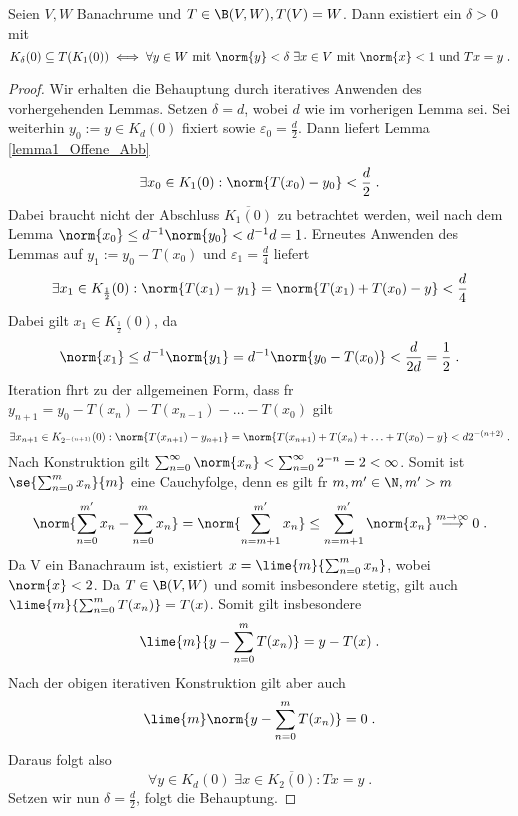 \begin{lemma}
	Seien \(V,W\) Banachr\as ume und \(T\in \B(V,W), T(V) = W\). Dann existiert ein \(\delta > 0\) mit 
	\[K_\delta(0) \subseteq T(K_1(0)) \iff \forall y\in W \text{ mit }\norm{y}<\delta \;\exists x\in V \text{ mit } \norm{x} < 1 \text{ und } Tx = y\;.\]
	\label{lemma2_Offene_Abb}
\end{lemma}
\begin{proof}
	Wir erhalten die Behauptung durch iteratives Anwenden des vorhergehenden Lemmas. Setzen \(\delta = d\), wobei $d$ wie im vorherigen Lemma sei. Sei weiterhin \(y_0:=y\in K_d(0)\) fixiert sowie \(\varepsilon_0 = \frac{d}{2}\). Dann liefert Lemma \ref{lemma1_Offene_Abb}
	\[\exists x_0 \in K_1(0): \norm{T(x_0) - y_0} < \frac{d}{2}\;.\]
	Dabei braucht nicht der Abschluss \(\overline{K_1(0)}\) zu betrachtet werden, weil nach dem Lemma \(\norm{x_0} \leq d^{-1} \norm{y_0} < d^{-1} d =1\). Erneutes Anwenden des Lemmas auf \(y_1:= y_0 -T(x_0)\) und \(\varepsilon_1 = \frac{d}{4}\) liefert
	\[\exists x_1 \in K_{\frac{1}{2}}(0): \norm{T(x_1) - y_1} = \norm{T(x_1) + T(x_0) - y} < \frac{d}{4}\]
	Dabei gilt \(x_1 \in K_{\frac{1}{2}}(0)\), da
	\[\norm{x_1} \leq d^{-1} \norm{y_1} = d^{-1} \norm{y_0 -T(x_0)} < \frac{d}{2d} = \frac{1}{2}\;.\]
	Iteration f\us hrt zu der allgemeinen Form, dass f\us r \(y_{n+1} = y_0 - T(x_n) -T(x_{n-1})- \ldots - T(x_0)\) gilt
	\[\exists x_{n+1} \in K_{2^{-(n+1)}}(0): \norm{T(x_{n+1})-y_{n+1}} =\norm{T(x_{n+1}) + T(x_n) + \ldots + T(x_0) - y} < d 2^{-(n+2)}\;.\]
	Nach Konstruktion gilt \(\sum_{n=0}^\infty \norm{x_n} < \sum_{n=0}^{\infty} 2^{-n} = 2 < \infty\). Somit ist \(\se{\sum_{n=0}^m x_n}{m}\) eine Cauchyfolge, denn es gilt f\us r \(m,m'\in \N, m' > m\)
	\[ \norm{\sum_{n=0}^{m'} x_n - \sum_{n=0}^{m} x_n} = \norm{\sum_{n=m+1}^{m'} x_n} \leq \sum_{n=m+1}^{m'} \norm{x_n} \overset{m\to\infty}{\longrightarrow} 0 \;.\]
	Da V ein Banachraum ist, existiert \(x = \lime{m}{\sum_{n=0}^m x_n}\), wobei \(\norm{x} < 2\). Da \(T\in \B(V,W)\) und somit insbesondere stetig, gilt auch \(\lime{m}{\sum_{n=0}^m T(x_n)} = T(x)\).
	Somit gilt insbesondere
	\[\lime{m}{y-\sum_{n=0}^m T(x_n)} = y - T(x)\;.\]
	Nach der obigen iterativen Konstruktion gilt aber auch
	\[\lime{m}\norm{y - \sum_{n=0}^m T(x_n)} = 0\;.\]
	Daraus folgt also 
	\[\forall y \in K_d(0) \;\exists x \in \overline{K_2(0)}: Tx = y\;.\]
	Setzen wir nun \(\delta = \frac{d}{2}\), folgt die Behauptung.	
\end{proof}

